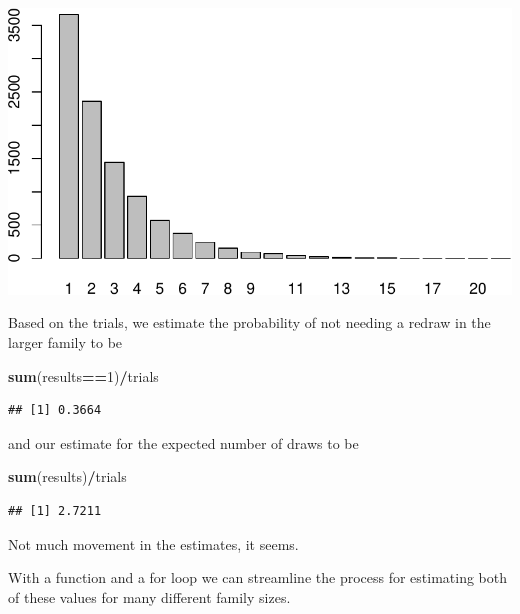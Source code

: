\documentclass[
]{book}
\newenvironment{Shaded}{\begin{snugshade}}{\end{snugshade}}
\newcommand{\DecValTok}[1]{\textcolor[rgb]{0.00,0.00,0.81}{#1}}
\newcommand{\FunctionTok}[1]{\textcolor[rgb]{0.13,0.29,0.53}{\textbf{#1}}}
\newcommand{\NormalTok}[1]{#1}
\newcommand{\SpecialCharTok}[1]{\textcolor[rgb]{0.81,0.36,0.00}{\textbf{#1}}}
\theoremstyle{definition}
\theoremstyle{definition}
\theoremstyle{definition}
\theoremstyle{definition}
\theoremstyle{remark}
\begin{document}
\includegraphics{math340-notes_files/figure-latex/unnamed-chunk-144-1.pdf}

Based on the trials, we estimate the probability of not needing a redraw in the larger family to be

\begin{Shaded}
\begin{Highlighting}[]
\FunctionTok{sum}\NormalTok{(results}\SpecialCharTok{==}\DecValTok{1}\NormalTok{)}\SpecialCharTok{/}\NormalTok{trials}
\end{Highlighting}
\end{Shaded}

\begin{verbatim}
## [1] 0.3664
\end{verbatim}

and our estimate for the expected number of draws to be

\begin{Shaded}
\begin{Highlighting}[]
\FunctionTok{sum}\NormalTok{(results)}\SpecialCharTok{/}\NormalTok{trials}
\end{Highlighting}
\end{Shaded}

\begin{verbatim}
## [1] 2.7211
\end{verbatim}

Not much movement in the estimates, it seems.

With a function and a for loop we can streamline the process for estimating both of these values for many different family sizes.
\end{document}
